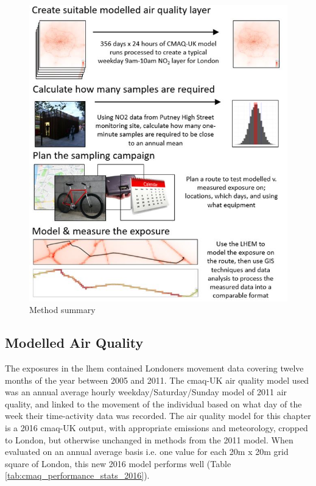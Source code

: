 \begin{figure}[H]
\centering
\includegraphics[scale=0.8]{images/comparison_method_summary.jpg}
\caption{Method summary}
\label{fig:comparison_method_summary}
\end{figure}

\subsection{Modelled Air Quality}
\label{subsec:4modelledairquality}

The exposures in the \gls{lhem} contained Londoners movement data covering twelve months of the year between 2005 and 2011. The \gls{cmaq}-UK air quality model used was an annual average hourly weekday/Saturday/Sunday model of 2011 air quality, and linked to the movement of the individual based on what day of the week their time-activity data was recorded. The air quality model for this chapter is a 2016 \gls{cmaq}-UK output, with appropriate emissions and meteorology, cropped to London, but otherwise unchanged in methods from the 2011 model. When evaluated on an annual average basis i.e. one value for each 20m x 20m grid square of London, this new 2016 model performs well (Table \ref{tab:cmaq_performance_stats_2016}).


